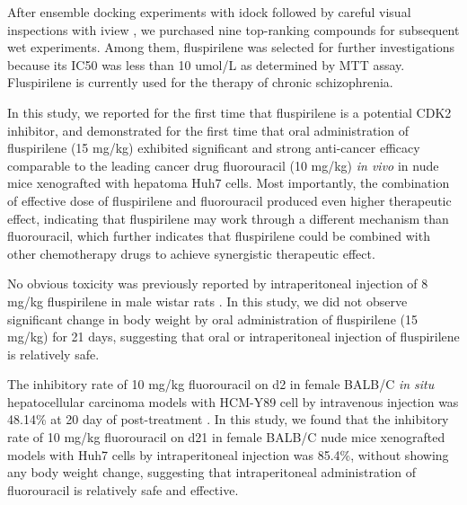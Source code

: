 \documentclass[10pt]{article}
\begin{document}
After ensemble docking experiments with idock \cite{1153,1362} followed by careful visual inspections with iview \cite{1366}, we purchased nine top-ranking compounds for subsequent wet experiments. Among them, fluspirilene was selected for further investigations because its IC50 was less than 10 umol/L as determined by MTT assay. Fluspirilene is currently used for the therapy of chronic schizophrenia.%

In this study, we reported for the first time that fluspirilene is a potential CDK2 inhibitor, and demonstrated for the first time that oral administration of fluspirilene (15 mg/kg) exhibited significant and strong anti-cancer efficacy comparable to the leading cancer drug fluorouracil (10 mg/kg) \textit{in vivo} in nude mice xenografted with hepatoma Huh7 cells. Most importantly, the combination of effective dose of fluspirilene and fluorouracil produced even higher therapeutic effect, indicating that fluspirilene may work through a different mechanism than fluorouracil, which further indicates that fluspirilene could be combined with other chemotherapy drugs to achieve synergistic therapeutic effect.

No obvious toxicity was previously reported by intraperitoneal injection of 8 mg/kg fluspirilene in male wistar rats \cite{}. In this study, we did not observe significant change in body weight by oral administration of fluspirilene (15 mg/kg) for 21 days, suggesting that oral or intraperitoneal injection of fluspirilene is relatively safe.

The inhibitory rate of 10 mg/kg fluorouracil on d2 in female BALB/C \textit{in situ} hepatocellular carcinoma models with HCM-Y89 cell by intravenous injection was 48.14\% at 20 day of post-treatment \cite{}. In this study, we found that the inhibitory rate of 10 mg/kg fluorouracil on d21 in female BALB/C nude mice xenografted models with Huh7 cells by intraperitoneal injection was 85.4\%, without showing any body weight change, suggesting that intraperitoneal administration of fluorouracil is relatively safe and effective.

\end{document}
